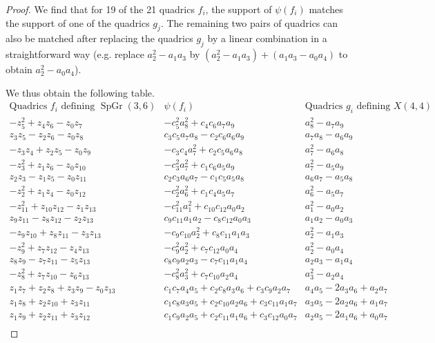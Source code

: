 \documentclass{amsart}[12pt]
\theoremstyle{definition}
\numberwithin{equation}{section}
\newcommand{\SpGr}{\operatorname{SpGr}(3,6)}
\begin{document}
\begin{proof}
We find that for 19 of the 21 quadrics $f_i$, the support of $\psi(f_i)$ matches the support of one of the quadrics $g_j$. The remaining two pairs of quadrics can also be matched after replacing the quadrics $g_j$ by a linear combination in a straightforward way (e.g. replace $a_{2}^{2}-a_{1}a_{3}$ by $(a_{2}^{2}-a_{1}a_{3}) + (a_{1}a_{3}-a_{0}a_{4})$ to obtain $a_{2}^{2}-a_{0}a_{4}$). 

We thus obtain the following table.
\[
\begin{array}{lll}
\text{Quadrics $f_i$ defining $\SpGr$} & \psi(f_i) & \text{Quadrics $g_i$ defining $X(4,4)$}\\
-z_5^2+z_4 z_6-z_0 z_7    &    -c_5^2 a_8^2+c_4 c_6 a_7 a_9    &    a_8^2-a_7 a_9\\
z_3 z_5-z_2 z_6-z_0 z_8    &    c_3 c_5 a_7 a_8-c_2 c_6 a_6 a_9    &    a_7 a_8-a_6 a_9\\
-z_3 z_4+z_2 z_5-z_0 z_9    &    -c_3 c_4 a_7^2+c_2 c_5 a_6 a_8    &    a_7^2-a_6 a_8\\
-z_3^2+z_1 z_6-z_0 z_10    &    -c_3^2 a_7^2+c_1 c_6 a_5 a_9    &    a_7^2-a_5 a_9\\
z_2 z_3-z_1 z_5-z_0 z_11    &    c_2 c_3 a_6 a_7-c_1 c_5 a_5 a_8    &    a_6 a_7-a_5 a_8\\
-z_2^2+z_1 z_4-z_0 z_12    &    -c_2^2 a_6^2+c_1 c_4 a_5 a_7    &    a_6^2-a_5 a_7\\
-z_11^2+z_10 z_12-z_1 z_13    &    -c_{11}^2 a_1^2+c_{10} c_{12} a_0 a_2    &    a_1^2-a_0 a_2\\
z_9 z_11-z_8 z_12-z_2 z_13    &    c_9 c_{11} a_1 a_2-c_8 c_{12} a_0 a_3    &    a_1 a_2-a_0 a_3\\
-z_9 z_10+z_8 z_11-z_3 z_13    &    -c_9 c_{10} a_2^2+c_8 c_{11} a_1 a_3    &    a_2^2-a_1 a_3\\
-z_9^2+z_7 z_12-z_4 z_13    &    -c_9^2 a_2^2+c_7 c_{12} a_0 a_4    &    a_2^2-a_0 a_4\\
z_8 z_9-z_7 z_11-z_5 z_13    &    c_8 c_9 a_2 a_3-c_7 c_{11} a_1 a_4    &    a_2 a_3-a_1 a_4\\
-z_8^2+z_7 z_10-z_6 z_13    &    -c_8^2 a_3^2+c_7 c_{10} a_2 a_4    &    a_3^2-a_2 a_4\\
z_1 z_7+z_2 z_8+z_3 z_9-z_0 z_13    &    c_1 c_7 a_4 a_5+c_2 c_8 a_3 a_6+c_3 c_9 a_2 a_7    &    a_4 a_5-2 a_3 a_6+a_2 a_7\\
z_1 z_8+z_2 z_10+z_3 z_11    &    c_1 c_8 a_3 a_5+c_2 c_{10} a_2 a_6+c_3 c_{11} a_1 a_7    &    a_3 a_5-2 a_2 a_6+a_1 a_7\\
z_1 z_9+z_2 z_11+z_3 z_12    &    c_1 c_9 a_2 a_5+c_2 c_{11} a_1 a_6+c_3 c_{12} a_0 a_7    &    a_2 a_5-2 a_1 a_6+a_0 a_7\\

\end{array}\]
\end{proof}
\end{document}
